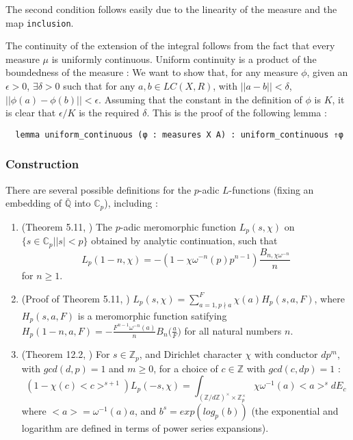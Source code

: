 \documentclass[a4paper,UKenglish,cleveref, autoref, thm-restate]{lipics-v2021}
\newcommand{\lean}[1]{\texttt{#1}\xspace} %
\begin{document}
The second condition follows easily due to the linearity of the measure and the map \lean{inclusion}. 

The continuity of the extension of the integral follows from the fact that every measure $\mu$ is uniformly continuous. Uniform continuity is a 
product of the boundedness of the measure : We want to show that, for any measure $\phi$, given an $\epsilon > 0$, $\exists \delta > 0$ such that 
for any $a, b \in LC(X, R)$, with $||a - b|| < \delta$, $|| \phi (a) - \phi (b) || < \epsilon$. Assuming that the constant in the definition of $\phi$ 
is $K$, it is clear that $\epsilon / K$ is the required $\delta$. This is the proof of the following lemma :
\begin{lstlisting}
  lemma uniform_continuous (φ : measures X A) : uniform_continuous ⇑φ 
\end{lstlisting}

\subsubsection{Construction}
There are several possible definitions for the $p$-adic $L$-functions (fixing an embedding of
$\mathbb{\bar{\mathbb{Q}}}$ into $\mathbb{C}_p$), including :
\begin{enumerate}{}{}
  \item (Theorem 5.11, \cite{cyc}) The $p$-adic meromorphic function $L_p(s, \chi)$ on
  \newline $\{ s \in \mathbb{C}_p | |s| < p \}$ obtained by analytic continuation, such that
  $$ L_p (1 - n, \chi) = -(1 - \chi \omega^{-n}(p)p^{n - 1}) \frac{B_{n, \chi \omega^{-n}}}{n} $$
  for $n \ge 1$.
  \item (Proof of Theorem 5.11, \cite{cyc})
  $L_p(s, \chi) = \sum_{a = 1, p\nmid a}^F \chi(a)H_p(s, a, F)$, where $H_p (s, a, F)$ is a 
  meromorphic function satifying 
  \newline $H_p(1 - n, a, F) = - \frac{F^{n - 1}\omega^{-n}(a)}{n} B_n \big( \frac{a}{F} \big)$ for all 
  natural numbers $n$.
  \item (Theorem 12.2, \cite{cyc}) For $s \in \mathbb{Z}_p$, and Dirichlet character $\chi$ with
  conductor $d p^m$, with $gcd (d, p) = 1$ and $m \ge 0$, for a choice of $c \in \mathbb{Z}$
  with $gcd (c, dp) = 1$ :
  $$ (1 - \chi(c)<c>^{s+1}) L_p(-s, \chi) = \int_{(\mathbb{Z}/d \mathbb{Z})^{\times} \times \mathbb{Z}_p^{\times}}
  \chi \omega^{-1}(a) <a>^s dE_c $$
  where $<a> = \omega^{-1}(a) a$, and $b^s = exp (log_p (b))$ (the exponential and logarithm are defined in 
  terms of power series expansions).
\end{enumerate}
\end{document}
